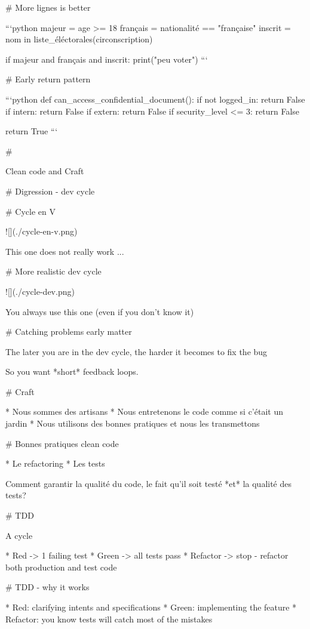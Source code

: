 # More lignes is better

```python
majeur = age >= 18
français = nationalité == "française"
inscrit = nom in liste_éléctorales(circonscription)

if majeur and français and inscrit:
    print("peu voter")
```


# Early return pattern

```python
def can_access_confidential_document():
    if not logged_in:
        return False
    if intern:
        return False
    if extern:
        return False
    if security_level <= 3:
        return False

    return True
```

#

\huge \center Clean code and Craft

# Digression - dev cycle

# Cycle en V

![](./cycle-en-v.png)

This one does not really work ...

# More realistic dev cycle

![](./cycle-dev.png)

\vfill

You always use this one (even if you don't know it)

# Catching problems early matter

The later you are in the dev cycle, the harder
it becomes to fix the bug

So you want *short* feedback loops.

# Craft

* Nous sommes des artisans
* Nous entretenons le code comme si c'était un jardin
* Nous utilisons des bonnes pratiques et nous les transmettons

# Bonnes pratiques clean code

* Le refactoring
* Les tests

Comment garantir la qualité du code, le fait qu'il soit testé *et* la qualité des tests?

# TDD

A cycle

* Red -> 1 failing test
* Green -> all tests pass
* Refactor -> stop - refactor both production and test code



# TDD - why it works

* Red: clarifying intents and specifications
* Green: implementing the feature
* Refactor: you know tests will catch most of the mistakes

